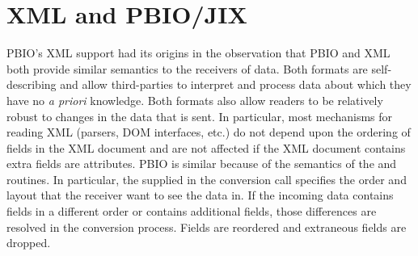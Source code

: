 \section{XML and PBIO/JIX\label{XML}}

PBIO's XML support had its origins in the observation that PBIO and XML both
provide similar semantics to the receivers of data.  Both formats are
self-describing and allow third-parties to interpret and process data about
which they have no {\it a priori} knowledge.  Both formats also allow
readers to be relatively robust to changes in the data that is sent.  In
particular, most mechanisms for reading XML (parsers, DOM interfaces, etc.)
do not depend upon the ordering of fields in the XML document and are not
affected if the XML document contains extra fields are attributes.  PBIO is
similar because of the semantics of the  and
 routines.  In particular, the
 supplied in the conversion call specifies the order
and layout that the receiver want to see the data in.  If the incoming data
contains fields in a different order or contains additional fields, those
differences are resolved in the conversion process.  Fields are reordered
and extraneous fields are dropped.

